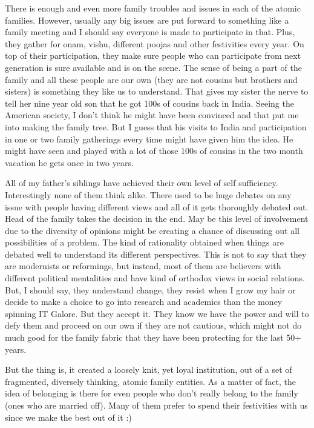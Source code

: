 {There is enough and even more family troubles and issues in each of the atomic families. However, usually any 
big issues are put forward to something like a family meeting and I should say everyone is made 
to participate in that. Plus, they gather for onam, vishu, different poojas and other festivities 
every year. On top of their participation, they make sure people who can participate from next
generation is sure available and is on the scene. The sense of being a part of the family and all these 
people are our own (they are not cousins but brothers and sisters) is something they like us to
understand. That gives my sister the nerve to tell her nine year old son that he got 100s of 
cousins back in India. Seeing the American society, I don't think he might have been convinced 
and that put me into making the family tree. But I guess that his visits to India and participation in one or 
two family gatherings every time might have given him the idea. He might have seen and 
played with a lot of those 100s of cousins in the two month vacation he gets once in two years. 

All of my father's siblings have achieved their own level of self sufficiency. Interestingly none of 
them think alike. There used to be huge debates on any issue with people having different views and all of it gets
thoroughly debated out. Head of the family takes the decision in the end. May be this level of
involvement due to the diversity of opinions might be creating a chance of discussing out all 
possibilities of a problem. The kind of rationality obtained when things are debated well to 
understand its different perspectives. This is not to say that they are modernists or reformings, but instead, most 
of them are believers with different political mentalities and have kind of orthodox views in 
social relations. But, I should say, they understand change, they resist when I grow my hair or 
decide to make a choice to go into research and academics than the money spinning IT Galore. 
But they accept it. They know we have the power and will to defy them and proceed on our own 
if they are not cautious, which might not do much good for the family fabric that they have been protecting 
for the last 50+ years.

But the thing is, it created a loosely knit, yet loyal institution, out of a set of fragmented, diversely
thinking, atomic family entities. As a matter of fact, the idea of belonging is there for even people who don't really 
belong to the family (ones who are married off). Many of them prefer to spend their
festivities with us since we make the best out of it :) 

}
